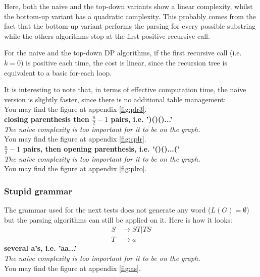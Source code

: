 \documentclass[twocolumn]{article}
\begin{document}
Here, both the naive and the top-down variants show a linear complexity, whilst the bottom-up variant has a quadratic complexity. This probably comes from the fact that the bottom-up variant performs the parsing for every possible substring while the others algorithms stop at the first positive recursive call.\par
For the naive and the top-down DP algorithms, if the first recursive call (i.e. $k=0$) is positive each time, the cost is linear, since the recursion tree is equivalent to a basic for-each loop.\par
It is interesting to note that, in terms of effective computation time, the naive version is slightly faster, since there is no additional table management:\\
You may find the figure at appendix \ref{fig:plr3}.
\\

\textbf{closing parenthesis then $\frac n2-1$ pairs, i.e. ')()()...'}\\
\textit{The naive complexity is too important for it to be on the graph.}\\
You may find the figure at appendix \ref{fig:cplr}.
\\

\textbf{$\frac n2-1$ pairs, then opening parenthesis, i.e. '()()...('}\\
\textit{The naive complexity is too important for it to be on the graph.}\\
You may find the figure at appendix \ref{fig:plro}.
\\

\subsubsection{Stupid grammar}
The grammar used for the next tests does not generate any word ($L(G)=\emptyset$) but the parsing algorithms can still be applied on it. Here is how it looks:
\begin{align*}
  S&\rightarrow ST|TS\\
  T&\rightarrow a
\end{align*}
\textbf{several a's, i.e. 'aa...'}\\
\textit{The naive complexity is too important for it to be on the graph.}\\
You may find the figure at appendix \ref{fig:as}.
\\
\end{document}
